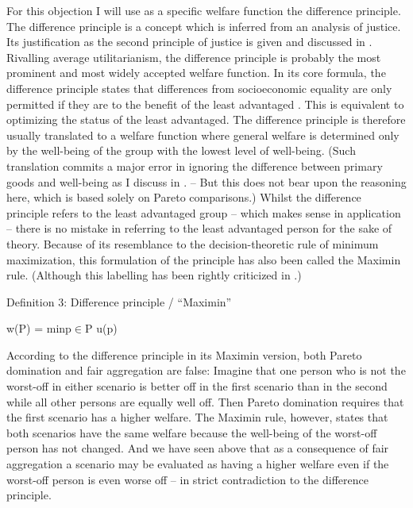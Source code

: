For this objection I will use as a specific welfare function the difference principle. The difference principle is a concept which is inferred from an analysis of justice. Its justification as the second principle of justice is given and discussed in \cite[pp.~3-183]{rawls_2005}. Rivalling average utilitarianism, the difference principle is probably the most prominent and most widely accepted welfare function. In its core formula, the difference principle states that differences from socioeconomic equality are only permitted if they are to the benefit of the least advantaged \cite[p.~302]{rawls_2005}. This is equivalent to optimizing the status of the least advantaged. The difference principle is therefore usually translated to a welfare function where general welfare is determined only by the well-being of the group with the lowest level of well-being. (Such translation commits a major error in ignoring the difference between primary goods and well-being as I discuss in . – But this does not bear upon the reasoning here, which is based solely on Pareto comparisons.) Whilst the difference principle refers to the least advantaged group – which makes sense in application – there is no mistake in referring to the least advantaged person for the sake of theory. Because of its resemblance to the decision-theoretic rule of minimum maximization, this formulation of the principle has also been called the Maximin rule. (Although this labelling has been rightly criticized in .) 

Definition 3: Difference principle / “Maximin” 

w(P) = minp${\in}$P u(p) 

According to the difference principle in its Maximin version, both Pareto domination and fair aggregation are false: Imagine that one person who is not the worst-off in either scenario is better off in the first scenario than in the second while all other persons are equally well off. Then Pareto domination requires that the first scenario has a higher welfare. The Maximin rule, however, states that both scenarios have the same welfare because the well-being of the worst-off person has not changed. And we have seen above that as a consequence of fair aggregation a scenario may be evaluated as having a higher welfare even if the worst-off person is even worse off – in strict contradiction to the difference principle.  

